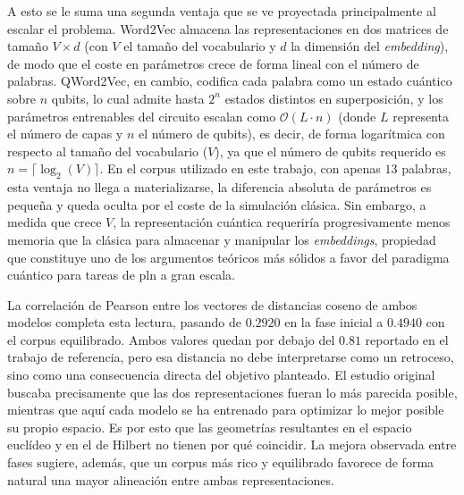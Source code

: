 A esto se le suma una segunda ventaja que se ve proyectada principalmente al escalar el problema. Word2Vec almacena las representaciones en dos matrices de tamaño $V \times d$ (con $V$ el tamaño del vocabulario y $d$ la dimensión del \textit{embedding}), de modo que el coste en parámetros crece de forma lineal con el número de palabras. QWord2Vec, en cambio, codifica cada palabra como un estado cuántico sobre $n$ qubits, lo cual admite hasta $2^n$ estados distintos en superposición, y los parámetros entrenables del circuito escalan como $\mathcal{O}(L \cdot n)$ (donde $L$ representa el número de capas y $n$ el número de qubits), es decir, de forma logarítmica con respecto al tamaño del vocabulario ($V$), ya que el número de qubits requerido es $n = \lceil \log_2(V) \rceil$. En el corpus utilizado en este trabajo, con apenas $13$ palabras, esta ventaja no llega a materializarse, la diferencia absoluta de parámetros es pequeña y queda oculta por el coste de la simulación clásica. Sin embargo, a medida que crece $V$, la representación cuántica requeriría progresivamente menos memoria que la clásica para almacenar y manipular los \textit{embeddings}, propiedad que constituye uno de los argumentos teóricos más sólidos a favor del paradigma cuántico para tareas de \gls{pln} a gran escala.

La correlación de Pearson entre los vectores de distancias coseno de ambos modelos completa esta lectura, pasando de $0.2920$ en la fase inicial a $0.4940$ con el corpus equilibrado. Ambos valores quedan por debajo del $0.81$ reportado en el trabajo de referencia, pero esa distancia no debe interpretarse como un retroceso, sino como una consecuencia directa del objetivo planteado. El estudio original buscaba precisamente que las dos representaciones fueran lo más parecida posible, mientras que aquí cada modelo se ha entrenado para optimizar lo mejor posible su propio espacio. Es por esto que las geometrías resultantes en el espacio euclídeo y en el de Hilbert no tienen por qué coincidir. La mejora observada entre fases sugiere, además, que un corpus más rico y equilibrado favorece de forma natural una mayor alineación entre ambas representaciones.

